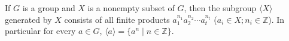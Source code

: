 \begin{theorem}
If $G$ is a group and $X$ is a nonempty subset of $G$, then the subgroup $\langle X \rangle$ generated by $X$ consists of all finite products $a_1^{n_1} a_2^{n_2} \cdots a_t^{n_t}$ ($a_i \in X; n_i \in \mathbb{Z}$). In particular for every $a \in G$, $\langle a \rangle = \{a^n \mid n \in \mathbb{Z}\}$.
\end{theorem}
